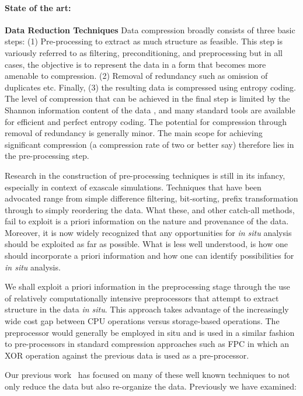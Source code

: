 \paragraph{State of the art:} {\bf Data Reduction Techniques} Data compression
broadly consists of three basic steps: (1) Pre-processing to extract as much
structure as feasible. This step is variously referred to as filtering,
preconditioning, and preprocessing but in all cases, the objective is to
represent the data in a form that becomes more amenable to compression.  (2)
Removal of redundancy such as omission of duplicates etc.  Finally, (3) the
resulting data is compressed using entropy coding. The level of compression
that can be achieved in the final step is limited by the Shannon information
content of the data \cite{Gray:book}, and many standard tools are available for
efficient and perfect entropy coding. The potential for compression through
removal of redundancy is generally minor. The main scope for achieving
significant compression (a compression rate of two or better say) therefore
lies in the pre-processing step.

Research in the construction of pre-processing techniques is still in its
infancy, especially in context of exascale simulations. Techniques that have
been advocated range from simple difference filtering, bit-sorting, prefix
transformation through to simply reordering the data.  What these, and other
catch-all methods, fail to exploit is a priori information on the nature and
provenance of the data. Moreover, it is now widely recognized that any
opportunities for {\em in situ} analysis should be exploited as far as
possible. What is less well understood, is how one should incorporate a priori
information and how one can identify possibilities for {\em in situ} analysis.

We shall exploit a priori information in the preprocessing stage through the
use of relatively computationally intensive preprocessors that attempt to
extract structure in the data {\em in situ}. This approach takes advantage of
the increasingly wide cost gap between CPU operations versus storage-based
operations. The preprocessor would generally be employed in situ and is used in
a similar fashion to pre-processors in standard compression approaches such as
FPC \cite{BurtscherFPC} in which an XOR operation against the previous data is
used as a pre-processor.

Our previous
work~\cite{lakshminarasimhan2011compressing,lakshminarasimhan2011compressing,%
gong2012multi,jenkins2012byte,gong2013parlo,boyuka2014transparent,%
tang2014improving}
has focused on many of these well known techniques to not only reduce the data
but also re-organize the data. Previously we have examined:


